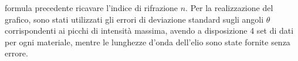 \documentclass[letterpaper,11pt]{article}
\begin{document}
\begin{body}
\newline\newline\newline\newline\newline\newline\newline\newline\newline\newline\newline\newline\newline\newline\newline\newline\newline\newline\newline\newline\newline\newline\newline\newline\newline\newline\newline
formula precedente ricavare l'indice di rifrazione $n$.
Per la realizzazione del grafico, sono stati utilizzati gli errori di deviazione standard sugli angoli $\theta$ corrispondenti ai picchi di intensità massima, avendo a disposizione 4 set di dati per ogni materiale, mentre le lunghezze d'onda dell'elio sono state fornite senza errore.\\ 



\end{body}
\end{document}
